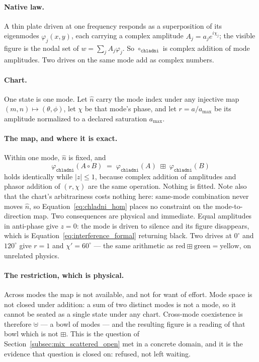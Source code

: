 \documentclass[12pt, a4paper]{article}
\begin{document}
\paragraph{Native law.}
A thin plate driven at one frequency responds as a superposition of
its eigenmodes $\varphi_j(x,y)$, each carrying a complex amplitude
$A_j=a_j e^{i\chi_j}$; the visible figure is the nodal set of
$w=\sum_j A_j\varphi_j$. So $\circ_{\mathtt{chladni}}$ is complex
addition of mode amplitudes. Two drives on the same mode add as
complex numbers.

\paragraph{Chart.}
One state is one mode. Let $\hat n$ carry the mode index under any
injective map $(m,n)\mapsto(\theta,\phi)$, let $\chi$ be that mode's
phase, and let $r=a/a_{\max}$ be its amplitude normalized to a
declared saturation $a_{\max}$.

\paragraph{The map, and where it is exact.}
Within one mode, $\hat n$ is fixed, and
\begin{equation}
    \varphi_{\mathtt{chladni}}(A\circ B)
    \;=\;
    \varphi_{\mathtt{chladni}}(A)\;\boxplus\;\varphi_{\mathtt{chladni}}(B)
    \label{eq:chladni_hom}
\end{equation}
holds identically while $|z|\le 1$, because complex addition of
amplitudes and phasor addition of $(r,\chi)$ are the same operation.
Nothing is fitted. Note also that the chart's arbitrariness costs
nothing here: same-mode combination never moves $\hat n$, so
Equation~\eqref{eq:chladni_hom} places no constraint on the
mode-to-direction map. Two consequences are physical and immediate.
Equal amplitudes in anti-phase give $z=0$: the mode is driven to
silence and its figure disappears, which is
Equation~\eqref{eq:interference_formal} returning black. Two drives at
$0^\circ$ and $120^\circ$ give $r=1$ and $\chi'=60^\circ$ --- the same
arithmetic as $\mathrm{red}\boxplus\mathrm{green}=\mathrm{yellow}$,
on unrelated physics.

\paragraph{The restriction, which is physical.}
Across modes the map is not available, and not for want of effort.
Mode space is not closed under addition: a sum of two distinct modes
is not a mode, so it cannot be seated as a single state under any
chart. Cross-mode coexistence is therefore $\uplus$ --- a bowl of
modes --- and the resulting figure is a reading of that bowl which is
not $\boxplus$. This is the question of
Section~\ref{subsec:mix_scattered_open} met in a concrete domain, and
it is the evidence that question is closed on: refused, not left
waiting.
\end{document}
